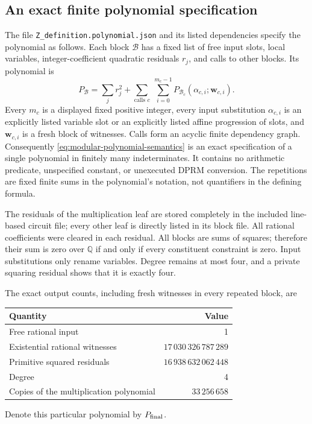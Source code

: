 \documentclass[11pt]{article}
\theoremstyle{definition}
\newcommand{\Q}{\mathbb Q}\newcommand{\Z}{\mathbb Z}
\begin{document}
\subsection{An exact finite polynomial specification}

The file \texttt{Z\_definition.polynomial.json} and its listed
dependencies specify the polynomial as follows. Each block
\(\mathcal B\) has a fixed list of free input slots, local variables,
integer-coefficient quadratic residuals \(r_j\), and calls to other
blocks. Its polynomial is
\begin{equation}\label{eq:modular-polynomial-semantics}
 P_{\mathcal B}=\sum_j r_j^2+
       \sum_{\text{calls }c}\ \sum_{i=0}^{m_c-1}
                  P_{\mathcal B_c}(\alpha_{c,i};\mathbf w_{c,i}).
\end{equation}
Every \(m_c\) is a displayed fixed positive integer, every input
substitution \(\alpha_{c,i}\) is an explicitly listed variable slot
or an explicitly listed affine progression of slots, and
\(\mathbf w_{c,i}\) is a fresh block of witnesses. Calls form an
acyclic finite dependency graph. Consequently
\eqref{eq:modular-polynomial-semantics} is an exact specification of a
single polynomial in finitely many indeterminates. It contains no
arithmetic predicate, unspecified constant, or unexecuted DPRM conversion.
The repetitions are fixed finite sums in the polynomial's notation,
not quantifiers in the defining formula.

The residuals of the multiplication leaf are stored completely in the
included line-based circuit file; every other leaf is directly listed
in its block file. All rational coefficients were cleared in each residual.
All blocks are sums of squares; therefore their sum is zero over \(\Q\)
if and only if every constituent constraint is zero. Input substitutions
only rename variables. Degree remains at most four, and a private squaring
residual shows that it is exactly four.

The exact output counts, including fresh witnesses in every repeated
block, are
\begin{center}
\begin{tabular}{lr}\toprule
Quantity & Value\\\midrule
Free rational input &1\\
Existential rational witnesses &\(17\,030\,326\,787\,289\)\\
Primitive squared residuals &\(16\,938\,632\,062\,448\)\\
Degree &4\\
Copies of the multiplication polynomial &\(33\,256\,658\)\\\bottomrule
\end{tabular}
\end{center}
Denote this particular polynomial by \(P_{\rm final}\).
\end{document}

